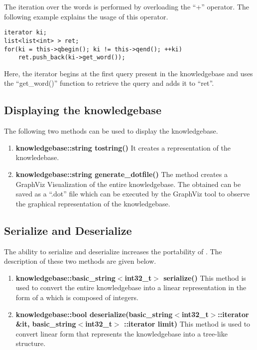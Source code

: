 The iteration over the words is performed by overloading the ``+'' operator. The following example explains the usage of this operator.
\begin{lstlisting}
iterator ki;
list<list<int> > ret;
for(ki = this->qbegin(); ki != this->qend(); ++ki)
	ret.push_back(ki->get_word());
\end{lstlisting}
Here, the iterator begins at the first query present in the knowledgebase and uses the ``get\_word()'' function to retrieve the query and adds it to ``ret''.

\subsection*{Displaying the knowledgebase}
The following two methods can be used to display the knowledgebase.

\begin{enumerate}

\item \textbf{knowledgebase::string tostring()} \vskip 1pt
It creates a \stringtype representation of the knowledebase.

\item \textbf{knowledgebase::string generate\_dotfile()} \vskip 1pt
The method creates a GraphViz Visualization of the entire knowledgebase. The \stringtype obtained can be saved as a ``.dot'' file which can be executed by the GraphViz tool to observe the graphical representation of the knowledgebase. 

\end {enumerate}

\subsection*{Serialize and Deserialize}
The ability to serialize and deserialize increases the portability of \libalf. The description of these two methods are given below.
	
\begin{enumerate}
\item \textbf{knowledgebase::basic\_string$<$int32\_t$>$ serialize()} \hfill \vskip 1pt
This method is used to convert the entire knowledgebase into a linear representation in the form of a \stringtype which is composed of integers.
\item \textbf{knowledgebase::bool deserialize(basic\_string$<$int32\_t$>$::iterator \&it, basic\_string$<$int32\_t$>$ ::iterator limit)} \hfill \vskip 1pt
This method is used to convert linear form that represents the knowledgebase into a tree-like structure.
\end{enumerate}	
	
